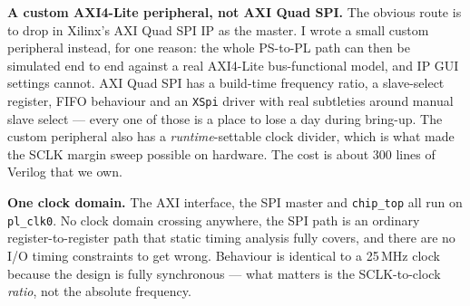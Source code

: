 \documentclass[11pt,a4paper]{article}
\begin{document}
\textbf{A custom AXI4-Lite peripheral, not AXI Quad SPI.} The obvious route is
to drop in Xilinx's AXI Quad SPI IP as the master. I wrote a small custom
peripheral instead, for one reason: the whole PS-to-PL path can then be
simulated end to end against a real AXI4-Lite bus-functional model, and IP GUI
settings cannot. AXI Quad SPI has a build-time frequency ratio, a slave-select
register, FIFO behaviour and an \texttt{XSpi} driver with real subtleties
around manual slave select --- every one of those is a place to lose a day
during bring-up. The custom peripheral also has a \emph{runtime}-settable clock
divider, which is what made the SCLK margin sweep possible on hardware. The
cost is about 300 lines of Verilog that we own.

\textbf{One clock domain.} The AXI interface, the SPI master and
\texttt{chip\_top} all run on \texttt{pl\_clk0}. No clock domain crossing
anywhere, the SPI path is an ordinary register-to-register path that static
timing analysis fully covers, and there are no I/O timing constraints to get
wrong. Behaviour is identical to a 25\,MHz clock because the design is fully
synchronous --- what matters is the SCLK-to-clock \emph{ratio}, not the
absolute frequency.
\end{document}
